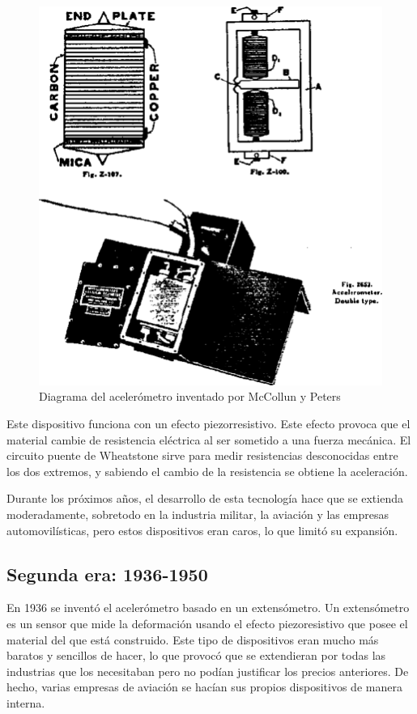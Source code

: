 \documentclass[12pt]{book}
\numberwithin{equation}{section}
\begin{document}
\begin{figure}[h]
    \centering
    \includegraphics[scale=0.2]{mcculling.png}
    \caption{Diagrama del acelerómetro inventado por McCollun y Peters}
    \label{fig:wheatstone}
\end{figure}

Este dispositivo funciona con un efecto piezorresistivo. Este efecto provoca que el material cambie de resistencia eléctrica al ser sometido a una fuerza mecánica. El circuito puente de Wheatstone sirve para medir resistencias desconocidas entre los dos extremos, y sabiendo el cambio de la resistencia se obtiene la aceleración.

Durante los próximos años, el desarrollo de esta tecnología hace que se extienda moderadamente, sobretodo en la industria militar, la aviación y las empresas automovilísticas, pero estos dispositivos eran caros, lo que limitó su expansión.

\subsection{Segunda era: 1936-1950}
En 1936\cite{50yearsof} se inventó el acelerómetro basado en un extensómetro. Un extensómetro es un sensor que mide la deformación usando el efecto piezoresistivo que posee el material del que está construido.  Este tipo de dispositivos eran mucho más baratos y sencillos de hacer, lo que provocó que se extendieran por todas las industrias que los necesitaban pero no podían justificar los precios anteriores. De hecho, varias empresas de aviación se hacían sus propios dispositivos de manera interna.
\end{document}
